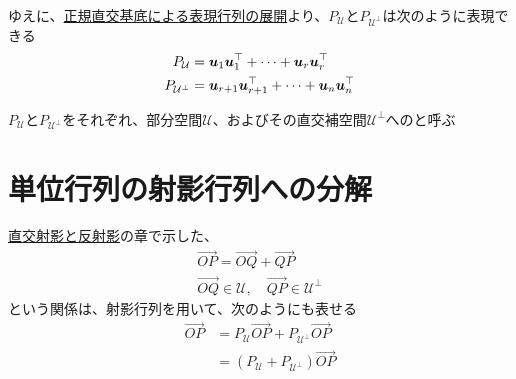 \documentclass[../../../topic_linear-algebra]{subfiles}
\begin{document}
\br

ゆえに、\hyperref[thm:orthobasis-formula-for-rep-matrix]{正規直交基底による表現行列の展開}より、$P_{\mathcal{U}}$と$P_{\mathcal{U}^{\perp}}$は次のように表現できる
\begin{align*}
  P_{\mathcal{U}}         & = \vb*{u}_1 \vb*{u}_1^\top + \cdots + \vb*{u}_r \vb*{u}_r^\top         \\
  P_{\mathcal{U}^{\perp}} & = \vb*{u}_{r+1} \vb*{u}_{r+1}^\top + \cdots + \vb*{u}_n \vb*{u}_n^\top
\end{align*}

$P_{\mathcal{U}}$と$P_{\mathcal{U}^{\perp}}$をそれぞれ、部分空間$\mathcal{U}$、およびその直交補空間$\mathcal{U}^{\perp}$へのと呼ぶ

\sectionline
\section{単位行列の射影行列への分解}

\hyperref[sec:orthogonal-projection-and-reflection]{直交射影と反射影}の章で示した、
\begin{gather*}
  \overrightarrow{OP} = \overrightarrow{OQ} + \overrightarrow{QP} \\
  \overrightarrow{OQ} \in \mathcal{U}, \quad \overrightarrow{QP} \in \mathcal{U}^\perp
\end{gather*}
という関係は、射影行列を用いて、次のようにも表せる
\begin{align*}
  \overrightarrow{OP} & = P_{\mathcal{U}}\overrightarrow{OP} + P_{\mathcal{U}^{\perp}}\overrightarrow{OP} \\
                      & = (P_{\mathcal{U}} + P_{\mathcal{U}^{\perp}})\overrightarrow{OP}
\end{align*}
\end{document}
